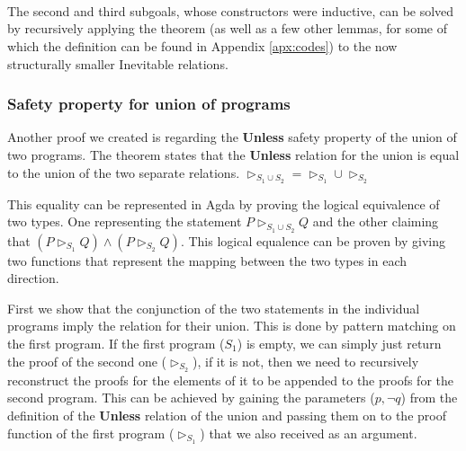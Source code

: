 \begin{code}
    \AgdaSymbol{)}\AgdaSpace{}%
    \AgdaSymbol{=}\<%
    \\
    \>[2][@{}l@{\AgdaIndent{0}}]%
    \>[4]\<%
    \\
    \>[4][@{}l@{\AgdaIndent{0}}]%
    \>[6]\AgdaSymbol{(}\AgdaSpace{}%
    \AgdaSymbol{)}\<%
    \\
    \>[6]\AgdaSymbol{(}\AgdaSpace{}%
    \AgdaSymbol{(}\AgdaSpace{}%
    \AgdaSymbol{(}\AgdaSpace{}%
    \AgdaOperator{\AgdaInductiveConstructor{,}}\AgdaSpace{}%
    \AgdaSymbol{)}\AgdaSpace{}%
    \AgdaOperator{\AgdaInductiveConstructor{,}}\AgdaSpace{}%
    \AgdaSpace{}%
    \AgdaSymbol{(}\AgdaSpace{}%
    \AgdaOperator{\AgdaInductiveConstructor{,}}\AgdaSpace{}%
    \AgdaSymbol{)))}\<%
\end{code}

The second and third subgoals, whose constructors were inductive, can be solved by recursively applying the theorem (as well as a few other lemmas, for some of which the definition can be found in Appendix \ref{apx:codes}) to the now structurally smaller Inevitable relations.

%     


\subsubsection{Safety property for union of programs}

Another proof we created is regarding the \textbf{Unless} safety property of the union of two programs. The theorem states that the \textbf{Unless} relation for the union is equal to the union of the two separate relations. $\rhd_{S_1 \cup S_2} = \rhd_{S_{1}} \cup \rhd_{S_{2}}$

This equality can be represented in Agda by proving the logical equivalence of two types. One representing the statement $P \rhd_{S_{1} \cup S_{2}} Q$ and the other claiming that $(P \rhd_{S_{1}} Q) \land (P \rhd_{S_{2}} Q)$. This logical equalence can be proven by giving two functions that represent the mapping between the two types in each direction.

First we show that the conjunction of the two statements in the individual programs imply the relation for their union. This is done by pattern matching on the first program. If the first program ($S_{1}$) is empty, we can simply just return the proof of the second one ($\rhd_{S_{2}}$), if it is not, then we need to recursively reconstruct the proofs for the elements of it to be appended to the proofs for the second program. This can be achieved by gaining the parameters ($p , \neg q$) from the definition of the \textbf{Unless} relation of the union and passing them on to the proof function of the first program ($\rhd_{S_{1}}$) that we also received as an argument.

